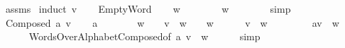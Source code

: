 \begin{isabellebody}
\ assms\isanewline
{}\isamarkupfalse%
\ {\isacharparenleft}{\kern0pt}induct\ v{\isacharparenright}{\kern0pt}\isanewline
\ \ \isamarkupfalse%
\ EmptyWord\isanewline
\ \ \isamarkupfalse%
\ {\isachardoublequoteopen}w\ {\isasymin}\ {\isasymSigma}\isactrlsup {\isacharasterisk}{\kern0pt}{\isachardoublequoteclose}\isanewline
\ \ \isamarkupfalse%
\ {\isachardoublequoteopen}{\isacharparenleft}{\kern0pt}{\isasymepsilon}\ {\isasymsqdot}\ w{\isacharparenright}{\kern0pt}\ {\isasymin}\ {\isasymSigma}\isactrlsup {\isacharasterisk}{\kern0pt}{\isachardoublequoteclose}\isanewline
\ \ \ \ \isamarkupfalse%
\ simp\isanewline
{}\isamarkupfalse%
\isanewline
\ \ \isamarkupfalse%
\ {\isacharparenleft}{\kern0pt}Composed\ a\ v{\isacharparenright}{\kern0pt}\isanewline
\ \ \isamarkupfalse%
\ {\isachardoublequoteopen}a\ {\isasymin}\ {\isasymSigma}{\isachardoublequoteclose}\isanewline
\ \ \isamarkupfalse%
\ \isamarkupfalse%
\ {\isachardoublequoteopen}w\ {\isasymin}\ {\isasymSigma}\isactrlsup {\isacharasterisk}{\kern0pt}\ {\isasymLongrightarrow}\ {\isacharparenleft}{\kern0pt}v\ {\isasymsqdot}\ w{\isacharparenright}{\kern0pt}\ {\isasymin}\ {\isasymSigma}\isactrlsup {\isacharasterisk}{\kern0pt}{\isachardoublequoteclose}\ \ {\isachardoublequoteopen}w\ {\isasymin}\ {\isasymSigma}\isactrlsup {\isacharasterisk}{\kern0pt}{\isachardoublequoteclose}\isanewline
\ \ \isamarkupfalse%
\ {\isachardoublequoteopen}{\isacharparenleft}{\kern0pt}v\ {\isasymsqdot}\ w{\isacharparenright}{\kern0pt}\ {\isasymin}\ {\isasymSigma}\isactrlsup {\isacharasterisk}{\kern0pt}{\isachardoublequoteclose}\ \isakeywordONE{{\isachardot}{\kern0pt}}\isamarkupfalse%
\isanewline
\ \ \isamarkupfalse%
\ \isamarkupfalse%
\ {\isachardoublequoteopen}{\isacharparenleft}{\kern0pt}{\isacharparenleft}{\kern0pt}a{\isacharhash}{\kern0pt}v{\isacharparenright}{\kern0pt}\ {\isasymsqdot}\ w{\isacharparenright}{\kern0pt}\ {\isasymin}\ {\isasymSigma}\isactrlsup {\isacharasterisk}{\kern0pt}{\isachardoublequoteclose}\isanewline
\ \ \ \ \isamarkupfalse%
\ WordsOverAlphabet{\isachardot}{\kern0pt}Composed{\isacharbrackleft}{\kern0pt}of\ a\ {\isachardoublequoteopen}v\ {\isasymsqdot}\ w{\isachardoublequoteclose}{\isacharbrackright}{\kern0pt}\isanewline
\ \ \ \ \isamarkupfalse%
\ simp\isanewline
{}\isamarkupfalse%

\end{isabellebody}
